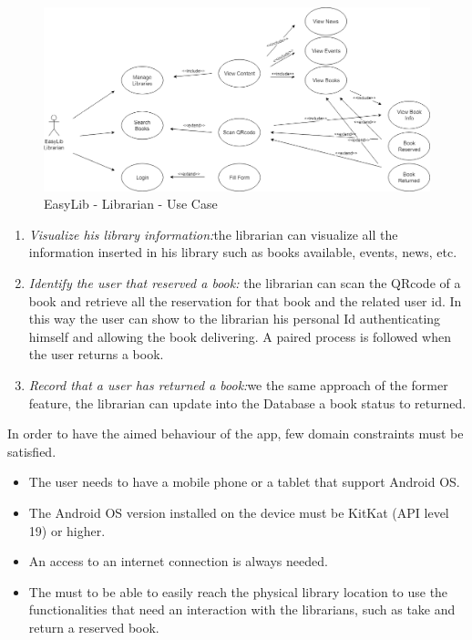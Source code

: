 \begin{figure}[H]
	\centering
	\includegraphics[scale=0.4]{Images/UseCases/EasyLib_Librarian_use_case}
	\caption{EasyLib - Librarian - Use Case}
\end{figure}
\begin{enumerate}
\item \emph{Visualize his library information:}the librarian can visualize all the information inserted in his library such as books available, events, news, etc.
\item \emph{Identify the user that reserved a book:} the librarian can scan the QRcode of a book and retrieve all the reservation for that book and the related user id. In this way the user can show to the librarian his personal Id authenticating himself and allowing the book delivering. A paired process is followed when the user returns a book.
\item \emph{Record that a user has returned a book:}we the same approach of the former feature, the librarian can update into the Database a book status to returned.
\end{enumerate}


In order to have the aimed behaviour of the app, few domain constraints must be satisfied.

\begin{itemize}
	\item The user needs to have a mobile phone or a tablet that support Android OS.
	\item The Android OS version installed on the device must be KitKat (API level 19) or higher.
	\item An access to an internet connection is always needed.
	\item The must to be able to easily reach the physical library location to use the functionalities that need an interaction with the librarians, such as take and return a reserved book.
\end{itemize}